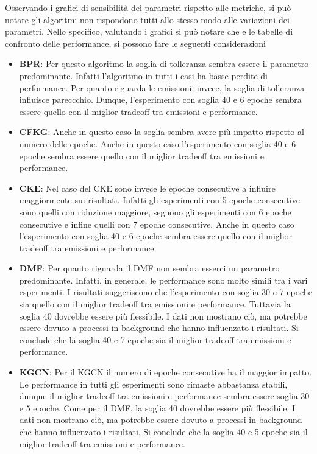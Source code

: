 \noindent Osservando i grafici di sensibilità dei parametri rispetto alle metriche, si può notare gli algoritmi non rispondono tutti allo stesso modo alle variazioni dei parametri.
Nello specifico, valutando i grafici si può notare che e le tabelle di confronto delle performance, si possono fare le seguenti considerazioni
\begin{itemize}
    \item \textbf{BPR}: Per questo algoritmo la soglia di tolleranza sembra essere il parametro predominante. Infatti l'algoritmo in tutti i casi ha basse perdite di performance. Per quanto riguarda le emissioni, invece, la soglia di tolleranza influisce pareccchio. Dunque, l'esperimento con soglia 40 e 6 epoche sembra essere quello con il miglior tradeoff tra emissioni e performance.
    \item \textbf{CFKG}: Anche in questo caso la soglia sembra avere più impatto rispetto al numero delle epoche. Anche in questo caso l'esperimento con soglia 40 e 6 epoche sembra essere quello con il miglior tradeoff tra emissioni e performance.
    \item \textbf{CKE}: Nel caso del CKE sono invece le epoche consecutive a influire maggiormente sui risultati. Infatti gli esperimenti con 5 epoche consecutive sono quelli con riduzione maggiore, seguono gli esperimenti con 6 epoche consecutive e infine quelli con 7 epoche consecutive. Anche in questo caso l'esperimento con soglia 40 e 6 epoche sembra essere quello con il miglior tradeoff tra emissioni e performance.
    \item \textbf{DMF}: Per quanto riguarda il DMF non sembra esserci un parametro predominante. Infatti, in generale, le performance sono molto simili tra i vari esperimenti. I risultati suggeriscono che l'esperimento con soglia 30 e 7 epoche sia quello con il miglior tradeoff tra emissioni e performance. Tuttavia la soglia 40 dovrebbe essere più flessibile. I dati non mostrano ciò, ma potrebbe essere dovuto a processi in background che hanno influenzato i risultati. Si conclude che la soglia 40 e 7 epoche sia il miglior tradeoff tra emissioni e performance.
    \item \textbf{KGCN}: Per il KGCN il numero di epoche consecutive ha il maggior impatto. Le performance in tutti gli esperimenti sono rimaste abbastanza stabili, dunque il miglior tradeoff tra emissioni e performance sembra essere soglia 30 e 5 epoche. Come per il DMF, la soglia 40 dovrebbe essere più flessibile. I dati non mostrano ciò, ma potrebbe essere dovuto a processi in background che hanno influenzato i risultati. Si conclude che la soglia 40 e 5 epoche sia il miglior tradeoff tra emissioni e performance.

\end{itemize}
